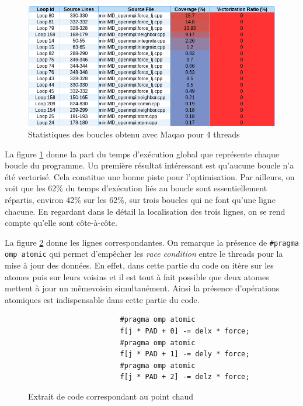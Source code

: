 \documentclass[11pt,a4paper]{article}
\begin{document}
			\begin{figure}[h!]
				\begin{center}
					\includegraphics[width=500px]{images/maqao_loops.png}
					\caption{Statistiques des boucles obtenu avec Maqao pour 4 threads}
					\label{loop_maqao}
				\end{center}
			\end{figure}

			La figure \ref{loop_maqao} donne la part du temps d'exécution global que représente chaque boucle du programme. Un première résultat intéressant est qu'aucune boucle n'a été vectorisé. Cela constitue une bonne piste pour l'optimisation. Par ailleurs, on voit que les 62\% du temps d'exécution liés au boucle sont essentiellement répartis, environ 42\% sur les 62\%, sur trois boucles qui ne font qu'une ligne chacune. En regardant dans le détail la localisation des trois lignes, on se rend compte qu'elle sont côte-à-côte.

			La figure \ref{code:hotspot} donne les lignes correspondantes. On remarque la présence de \verb!#pragma omp atomic! qui permet d'empêcher les \textit{race condition} entre le threads pour la mise à jour des données. En effet, dans cette partie du code on itère sur les atomes puis sur leurs voisins et il est tout à fait possible que deux atomes mettent à jour un mêmevoisin simultanément. Ainsi la présence d'opérations atomiques est indispensable dans cette partie du code.

			\begin{figure}[h!]
				\caption{Extrait de code correspondant au point chaud}
				\label{code:hotspot}
				\begin{verbatim}
					  #pragma omp atomic
					  f[j * PAD + 0] -= delx * force;
					  #pragma omp atomic
					  f[j * PAD + 1] -= dely * force;
					  #pragma omp atomic
					  f[j * PAD + 2] -= delz * force;
				\end{verbatim}
			\end{figure}
\end{document}
